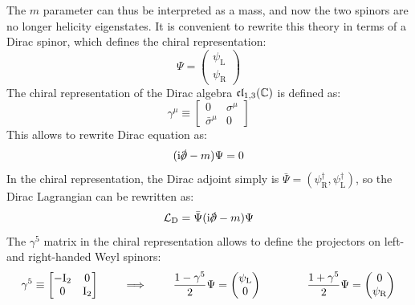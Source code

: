 The $ m $ parameter can thus be interpreted as a mass, and now the two spinors are no longer helicity eigenstates. It is convenient to rewrite this theory in terms of a Dirac spinor, which defines the chiral representation:
\begin{equation*}
  \Psi =
  \begin{pmatrix}
    \psi_\text{L} \\
    \psi_\text{R}
  \end{pmatrix}
\end{equation*}
The chiral representation of the Dirac algebra $ \mathfrak{cl}_{1,3}(\mathbb{C}) $ is defined as\footnotemark:
\begin{equation*}
  \gamma^\mu \equiv
  \begin{bmatrix}
    0 & \sigma^\mu \\
    \bar{\sigma}^\mu & 0
  \end{bmatrix}
\end{equation*}
%
%
This allows to rewrite Dirac equation as:
\begin{equation}
  (\img \slashed{\pa} - m) \Psi = 0
\end{equation}
In the chiral representation, the Dirac adjoint simply is $ \bar{\Psi} = (\psi_\text{R}^\dagger, \psi_\text{L}^\dagger) $, so the Dirac Lagrangian can be rewritten as:
\begin{equation}
  \lag_\text{D} = \bar{\Psi} (\img \slashed{\pa} - m) \Psi
  \label{eq:dirac-lagrangian}
\end{equation}
The $ \gamma^5 $ matrix in the chiral representation allows to define the projectors on left- and right-handed Weyl spinors:
\begin{equation}
  \gamma^5 \equiv
  \begin{bmatrix}
    -\mathrm{I}_2 & 0 \\ 0 & \mathrm{I}_2
  \end{bmatrix}
  \qquad \implies \qquad
  \frac{1 - \gamma^5}{2} \Psi =
  \begin{pmatrix}
    \psi_\text{L} \\ 0
  \end{pmatrix}
  \qquad \qquad
  \frac{1 + \gamma^5}{2} \Psi =
  \begin{pmatrix}
    0 \\ \psi_\text{R}
  \end{pmatrix}
\end{equation}

